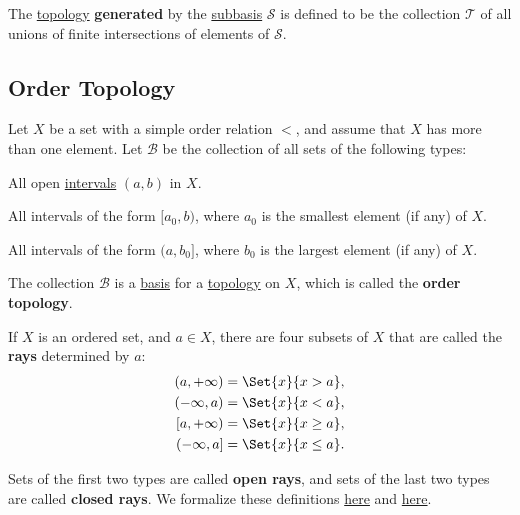 \label{d1d3329}

The \href{cc8eb8b}{topology} \textbf{generated} by the \href{aba7b48}{subbasis}
$\mathcal S$ is defined to be the collection $\mathcal T$ of all unions of
finite intersections of elements of $\mathcal S$.

\subsection{Order Topology}\label{febb684}

\label{aaff6da}

Let $X$ be a set with a simple order relation $<$, and assume that $X$ has more
than one element. Let $\mathcal B$ be the collection of all sets of the
following types:
\begin{enumerati}
  \def\smol{[a_0,b)}\def\big{(a,b_0]}
  \item All open \href{c65e94a}{intervals} $(a,b)$ in $X$.
  \item All intervals of the form $\smol$, where $a_0$ is the smallest element
        (if any) of $X$.
  \item All intervals of the form $\big$, where $b_0$ is the largest element
        (if any) of $X$.
\end{enumerati}

The collection $\mathcal B$ is a \href{e896402}{basis} for a
\href{cc8eb8b}{topology} on $X$, which is called the \textbf{order topology}.

\label{e91efe4}

If $X$ is an ordered set, and $a\in X$, there are four subsets of $X$ that are
called the \textbf{rays} determined by $a$:
\begin{align*}
  (a,+\infty) &=\Set{x}{x>a},     \\
  (-\infty,a) &=\Set{x}{x<a},     \\
  [a,+\infty) &=\Set{x}{x\geq a}, \\
  (-\infty,a] &=\Set{x}{x\leq a}.
\end{align*}

Sets of the first two types are called \textbf{open rays}, and sets of the last
two types are called \textbf{closed rays}. We formalize these definitions
\href{b1745d9}{here} and \href{a52dbf3}{here}.

\label{b1745d9}

